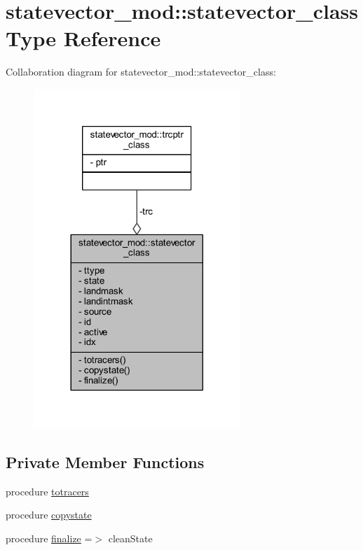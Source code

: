 \hypertarget{structstatevector__mod_1_1statevector__class}{}\section{statevector\+\_\+mod\+:\+:statevector\+\_\+class Type Reference}
\label{structstatevector__mod_1_1statevector__class}


Collaboration diagram for statevector\+\_\+mod\+:\+:statevector\+\_\+class\+:\nopagebreak
\begin{figure}[H]
\begin{center}
\leavevmode
\includegraphics[width=221pt]{structstatevector__mod_1_1statevector__class__coll__graph}
\end{center}
\end{figure}
\subsection*{Private Member Functions}
\begin{DoxyCompactItemize}
\item 
procedure \mbox{\hyperlink{structstatevector__mod_1_1statevector__class_a2e50a7dc4a09d1319aef60d94dec4a25}{totracers}}
\item 
procedure \mbox{\hyperlink{structstatevector__mod_1_1statevector__class_a4cce0e53e87b8fd70b0dc5e05c930b48}{copystate}}
\item 
procedure \mbox{\hyperlink{structstatevector__mod_1_1statevector__class_ae4fb91ef1a88cb853f28fc6fcc2eba6f}{finalize}} =$>$ clean\+State
\end{DoxyCompactItemize}
